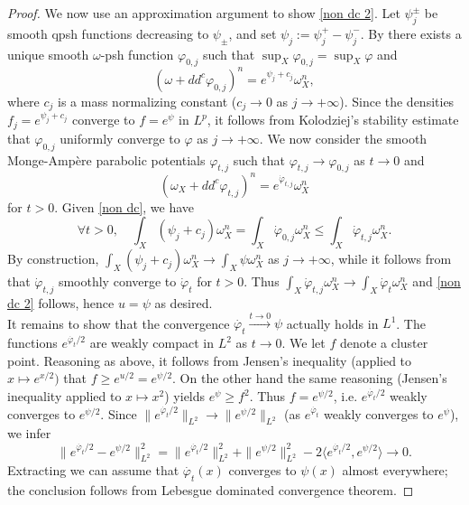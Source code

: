 \documentclass[a4paper,11pt,leqno,english]{smfart}
\theoremstyle{plain}
\theoremstyle{plain}
\numberwithin{equation}{section} %
\numberwithin{figure}{section} %
\theoremstyle{plain}
\theoremstyle{plain}
\theoremstyle{remark}
\theoremstyle{remark}
\theoremstyle{definition}
\theoremstyle{plain}
\theoremstyle{plain}
\theoremstyle{definition}
\newcommand{\f}{\varphi}
\newcommand{\p}{\psi}
\begin{document}
\begin{proof}
 
 We now use an approximation argument to show \eqref{non dc 2}.  Let $\p_j^{\pm}$ be smooth qpsh functions decreasing to $\p_{\pm}$, and set $\psi_j:=\psi_j^+-\psi_j^-$. 
 By \cite{Yau78} there exists a unique smooth $\omega$-psh function $\f_{0,j}$ such that
 $\sup_X \f_{0,j}=\sup_X \f$ and
 $$
 (\omega+dd^c \f_{0,j})^n=e^{\psi_j+c_j} \omega_X^n,
 $$
 where $c_j$ is a mass normalizing constant ($c_j \rightarrow 0$ as $j \rightarrow +\infty$).
 Since the densities $f_j=e^{\p_j +c_j}$ converge to $f=e^{\p}$ in $L^p$, 
 it follows from Kolodziej's stability estimate \cite{Kolstab} that 
 $\f_{0,j}$ uniformly converge to $\f$ as $j \rightarrow +\infty$.
 We now consider the smooth Monge-Amp\`ere parabolic potentials $\f_{t,j}$ such that
 $\f_{t,j} \rightarrow \f_{0,j}$ as $t \rightarrow 0$ and
 $$
 (\omega_X+dd^c \f_{t,j})^n =e^{\dot{\f}_{t,j}} \omega_X^n
 $$
 for $t>0$. Given \eqref{non dc}, we have
 $$\forall t>0, \quad 
   \int_X (\p_j+c_j) \omega_X^n
 =  \int_X \dot{\f}_{0,j} \omega_X^n \leq \int_X \dot{\f}_{t,j} \omega_X^n.
 $$
 By construction, $\int_X (\p_j +c_j) \omega_X^n \rightarrow \int_X \p \omega_X^n$
 as $j \rightarrow +\infty$,
 while it follows from \cite{GLZ20} that $\dot{\f}_{t,j}$ smoothly converge
 to $\dot{\f}_{t}$ for $t>0$. Thus $\int_X \dot{\f}_{t,j} \omega_X^n \rightarrow \int_X \dot{\f}_{t} \omega_X^n$
 and \eqref{non dc 2} follows, hence $u=\psi$ as desired.\\
 
 
 
 It remains to show that the convergence 
 $\dot{\f_t} \stackrel{t \rightarrow 0}{\longrightarrow} \p$ actually holds in $L^1$.
 The functions $e^{\dot{\f_t}/2}$ are weakly compact in $L^2$ as $t \rightarrow 0$.
 We let $f$ denote a cluster point. Reasoning as above, it follows from Jensen's inequality
 (applied to  $x \mapsto e^{x/2})$ that $f \geq e^{u/2}=e^{\p/2}$.
 On the other hand the same reasoning (Jensen's inequality applied to $x \mapsto x^2$) yields $e^{\p} \geq f^2$.
 Thus $f=e^{\p/2}$, i.e. $e^{\dot{\f_t}/2}$ weakly converges to $e^{\p/2}$.
 Since $\|e^{\dot{\f_t}/2}\|_{L^2} \rightarrow \|e^{\p/2}\|_{L^2}$ (as
 $e^{\dot{\f_t}}$ weakly converges to $e^{\p}$), we infer $$
 \|e^{\dot{\f_t}/2}-e^{\p/2}\|^2_{L^2}
 = \|e^{\dot{\f_t}/2}\|_{L^2}^2+\|e^{\p/2}\|_{L^2}^2-2 \langle e^{\dot{\f_t}/2}, e^{\p/2} \rangle \rightarrow 0.
 $$
 Extracting we can assume that $\dot{\f_t}(x)$ converges  to $\p(x)$ almost everywhere;
 the conclusion follows from Lebesgue dominated convergence theorem.
 \end{proof}
\end{document}
